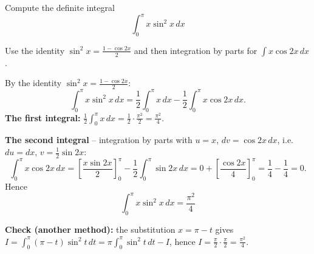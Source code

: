 
\begin{question}
Compute the definite integral
\[ \int_0^{\pi}x\sin^2x\,dx \]
\end{question}

\begin{hint}
Use the identity $\sin^2x=\frac{1-\cos 2x}{2}$ and then integration by parts for $\int x\cos2x\,dx$.
\end{hint}

\begin{solution}
By the identity $\sin^2x=\frac{1-\cos2x}{2}$:
\[ \int_0^{\pi}x\sin^2x\,dx=\frac12\int_0^{\pi}x\,dx-\frac12\int_0^{\pi}x\cos2x\,dx. \]
\textbf{The first integral:} $\frac12\int_0^\pi x\,dx=\frac12\cdot\frac{\pi^2}{2}=\frac{\pi^2}{4}$.

\textbf{The second integral} -- integration by parts with $u=x$, $dv=\cos2x\,dx$, i.e. $du=dx$, $v=\frac12\sin2x$:
\[ \int_0^{\pi}x\cos2x\,dx=\left[\frac{x\sin2x}{2}\right]_0^{\pi}-\frac12\int_0^{\pi}\sin2x\,dx = 0+\left[\frac{\cos2x}{4}\right]_0^{\pi}=\frac14-\frac14=0. \]
Hence
\[ \boxed{\int_0^{\pi}x\sin^2x\,dx=\frac{\pi^2}{4}} \]

\textbf{Check (another method):} the substitution $x=\pi-t$ gives $I=\int_0^\pi(\pi-t)\sin^2t\,dt=\pi\int_0^\pi\sin^2t\,dt-I$, hence $I=\frac\pi2\cdot\frac\pi2=\frac{\pi^2}{4}$.
\end{solution}
